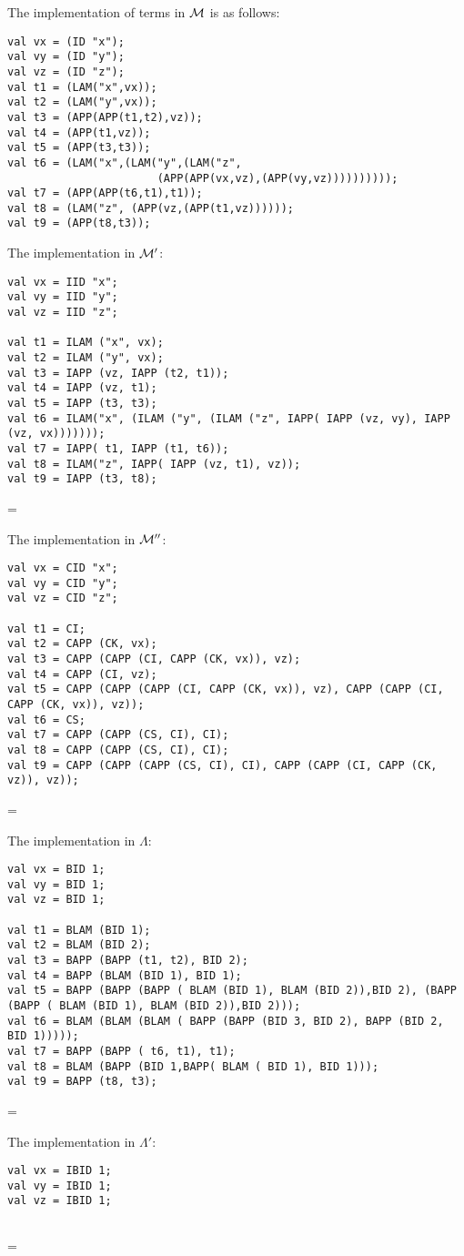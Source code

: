 \documentclass[11pt]{article}
\newenvironment{neverbreak} %
{\par\nobreak\vfil\penalty0\vfilneg
	\vtop\bgroup}
{\par\xdef\tpd{\the\prevdepth}\egroup
	\prevdepth=\tpd}
\begin{document}
\begin{enumerate}
\noindent
The implementation of terms in ${\cal M}$ is as follows:
\begin{verbatim}
val vx = (ID "x");
val vy = (ID "y");
val vz = (ID "z");
val t1 = (LAM("x",vx));
val t2 = (LAM("y",vx));
val t3 = (APP(APP(t1,t2),vz));
val t4 = (APP(t1,vz));
val t5 = (APP(t3,t3));
val t6 = (LAM("x",(LAM("y",(LAM("z",
                       (APP(APP(vx,vz),(APP(vy,vz))))))))));
val t7 = (APP(APP(t6,t1),t1));
val t8 = (LAM("z", (APP(vz,(APP(t1,vz))))));
val t9 = (APP(t8,t3));
\end{verbatim}

\vspace{1cm}
\begin{neverbreak}
The implementation in ${\cal M}'$:
\begin{verbatim}
val vx = IID "x";
val vy = IID "y";
val vz = IID "z";

val t1 = ILAM ("x", vx);
val t2 = ILAM ("y", vx);
val t3 = IAPP (vz, IAPP (t2, t1));
val t4 = IAPP (vz, t1);
val t5 = IAPP (t3, t3);
val t6 = ILAM("x", (ILAM ("y", (ILAM ("z", IAPP( IAPP (vz, vy), IAPP (vz, vx)))))));
val t7 = IAPP( t1, IAPP (t1, t6));
val t8 = ILAM("z", IAPP( IAPP (vz, t1), vz));
val t9 = IAPP (t3, t8);
\end{verbatim}
\end{neverbreak}
\vspace{1cm}
\begin{neverbreak}
The implementation in ${\cal M}''$:
\begin{verbatim}
val vx = CID "x";
val vy = CID "y";
val vz = CID "z";

val t1 = CI;
val t2 = CAPP (CK, vx);
val t3 = CAPP (CAPP (CI, CAPP (CK, vx)), vz);
val t4 = CAPP (CI, vz);
val t5 = CAPP (CAPP (CAPP (CI, CAPP (CK, vx)), vz), CAPP (CAPP (CI, CAPP (CK, vx)), vz));
val t6 = CS;
val t7 = CAPP (CAPP (CS, CI), CI);
val t8 = CAPP (CAPP (CS, CI), CI);
val t9 = CAPP (CAPP (CAPP (CS, CI), CI), CAPP (CAPP (CI, CAPP (CK, vz)), vz));
\end{verbatim}
\end{neverbreak}
\vspace{1cm}
\begin{neverbreak}
The implementation in $\Lambda$:
\begin{verbatim}
val vx = BID 1;
val vy = BID 1;
val vz = BID 1;

val t1 = BLAM (BID 1);
val t2 = BLAM (BID 2);
val t3 = BAPP (BAPP (t1, t2), BID 2);
val t4 = BAPP (BLAM (BID 1), BID 1);
val t5 = BAPP (BAPP (BAPP ( BLAM (BID 1), BLAM (BID 2)),BID 2), (BAPP (BAPP ( BLAM (BID 1), BLAM (BID 2)),BID 2)));
val t6 = BLAM (BLAM (BLAM ( BAPP (BAPP (BID 3, BID 2), BAPP (BID 2, BID 1)))));
val t7 = BAPP (BAPP ( t6, t1), t1);
val t8 = BLAM (BAPP (BID 1,BAPP( BLAM ( BID 1), BID 1)));
val t9 = BAPP (t8, t3);
\end{verbatim}
\end{neverbreak}
\vspace{1cm}
\begin{neverbreak}
The implementation in $\Lambda'$:
\begin{verbatim}
val vx = IBID 1;
val vy = IBID 1;
val vz = IBID 1;


\end{verbatim}
\end{neverbreak}
\end{enumerate}
\end{document}
